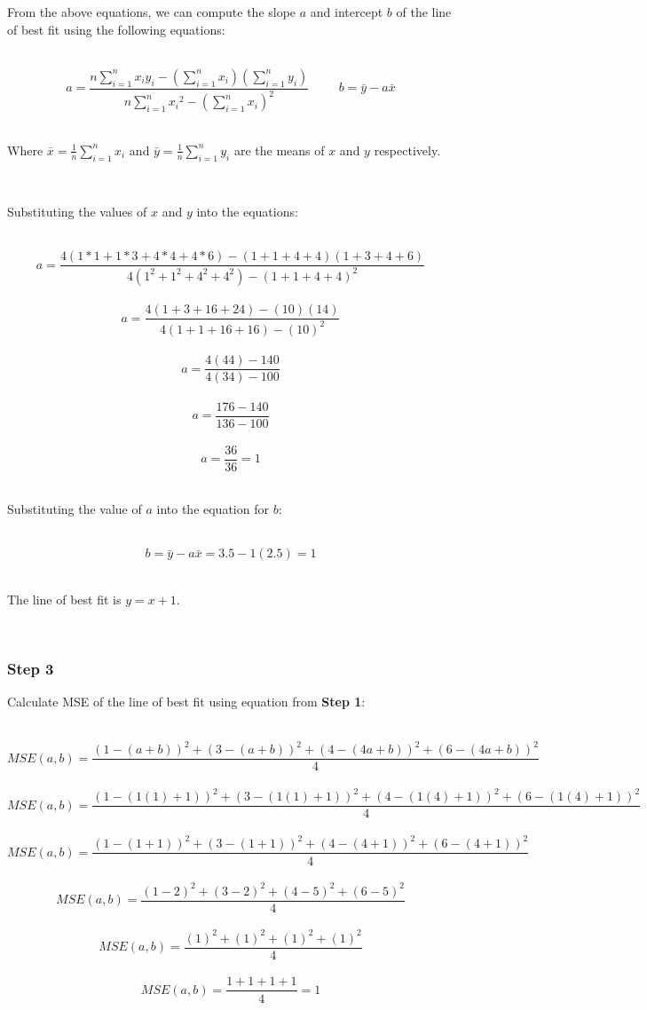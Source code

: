 \documentclass{article}
\begin{document}
\parbox{\textwidth}{
From the above equations, we can compute the slope $a$ and intercept $b$ of the line of best fit using the following equations:
}\\

$$a = \frac{n\sum_{i=1}^{n}x_i y_i - (\sum_{i=1}^{n}x_i)(\sum_{i=1}^{n}y_i)}{n\sum_{i=1}^{n}{x_i}^2-(\sum_{i=1}^{n}{x_i})^2} \hspace{1cm} b =\bar{y}-a\bar{x}$$\\

\parbox{\textwidth}{
Where $\bar{x} = \frac{1}{n}\sum_{i=1}^{n}x_i$ and $\bar{y} = \frac{1}{n}\sum_{i=1}^{n}y_i$ are the means of $x$ and $y$ respectively.
}\\

\parbox{\textwidth}{
Substituting the values of $x$ and $y$ into the equations:
}\\

$$a = \frac{4(1*1+1*3+4*4+4*6) - (1+1+4+4)(1+3+4+6)}{4(1^2+1^2+4^2+4^2)-(1+1+4+4)^2}$$\\
$$a = \frac{4(1+3+16+24) - (10)(14)}{4(1+1+16+16)-(10)^2}$$\\
$$a = \frac{4(44) - 140}{4(34)-100}$$\\
$$a = \frac{176 - 140}{136-100}$$\\
$$a = \frac{36}{36} = 1$$\\

\parbox{\textwidth}{
Substituting the value of $a$ into the equation for $b$:
}\\

$$b = \bar{y}-a\bar{x} = 3.5 - 1(2.5) = 1$$\\
\parbox{\textwidth}{
The line of best fit is $y = x + 1$.
}\\
\subsubsection*{Step 3}
\parbox{\textwidth}{
Calculate MSE of the line of best fit using equation from \textbf{Step 1}:
}\\
$$MSE(a,b) = \frac{(1-(a+b))^2+(3-(a+b))^2+(4-(4a+b))^2+(6-(4a+b))^2}{4} $$\\
$$MSE(a,b) = \frac{(1-(1(1)+1))^2+(3-(1(1)+1))^2+(4-(1(4)+1))^2+(6-(1(4)+1))^2}{4} $$\\
$$MSE(a,b) = \frac{(1-(1+1))^2+(3-(1+1))^2+(4-(4+1))^2+(6-(4+1))^2}{4} $$\\
$$MSE(a,b) = \frac{(1-2)^2+(3-2)^2+(4-5)^2+(6-5)^2}{4} $$\\
$$MSE(a,b) = \frac{(1)^2+(1)^2+(1)^2+(1)^2}{4} $$\\
$$MSE(a,b) = \frac{1+1+1+1}{4} = 1$$\\
\end{document}

